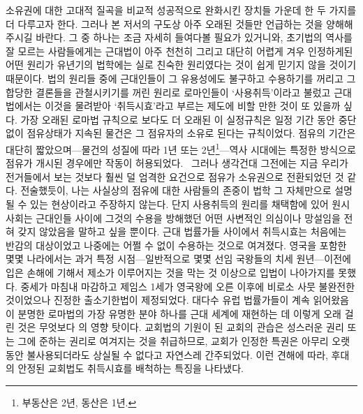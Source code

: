 소유권에 대한 고대적 질곡을 비교적 성공적으로 완화시킨 장치들 가운데
한 두 가지를 더 다루고자 한다.
그러나 본 저서의 구도상 아주 오래된 것들만 언급하는 것을
양해해 주시길 바란다.
그 중 하나는 조금 자세히 들여다볼 필요가 있거니와,
초기법의 역사를 잘 모르는 사람들에게는
근대법이 아주 천천히 그리고 대단히 어렵게 겨우 인정하게된
어떤 원리가 유년기의 법학에는 실로 친숙한 원리였다는 것이
쉽게 믿기지 않을 것이기 때문이다.
법의 원리들 중에
근대인들이 그 유용성에도 불구하고
수용하기를 꺼리고 그 합당한 결론들을 관철시키기를 꺼린
원리로
로마인들이 `\hypertarget{usucapio}{사용취득}'이라고
불렀고
근대법에서는
이것을 물려받아
`취득시효'라고 부르는 제도에
비할 만한 것이 또 있을까 싶다.
가장 오래된 로마법 규칙으로
보다도 더 오래된
이 실정규칙은
일정 기간 동안 중단 없이 점유상태가 지속된 물건은
그 점유자의 소유로 된다는 규칙이었다.
점유의 기간은 대단히 짧았으며---물건의 성질에 따라
1년 또는 2년\footnote{%
  부동산은 2년, 동산은 1년.
}---역사
시대에는 특정한 방식으로 점유가 개시된 경우에만 작동이 허용되었다.%
\footnotemark\
그러나 생각건대 그전에는
지금 우리가 전거들에서 보는 것보다 훨씬 덜 엄격한 요건으로
점유가 소유권으로 전환되었던 것 같다.%
전술했듯이,
나는 사실상의 점유에 대한 사람들의 존중이
법학 그 자체만으로 설명될 수 있는 현상이라고 주장하지 않는다.
단지 사용취득의 원리를 채택함에 있어 원시사회는
근대인들 사이에 그것의 수용을 방해했던
어떤 사변적인 의심이나 망설임을 전혀 갖지 않았음을 말하고 싶을 뿐이다.
근대 법률가들 사이에서 취득시효는
처음에는 반감의 대상이었고
나중에는 어쩔 수 없이 수용하는 것으로 여겨졌다.
영국을 포함한 몇몇 나라에서는
과거 특정 시점---일반적으로 몇몇 선임 국왕들의 치세 원년---이전에 입은
손해에 기해서 제소가
이루어지는 것을 막는 것 이상으로
입법이 나아가지를 못했다.
중세가 마침내 마감하고
제임스 1세가 영국왕에 오른 이후에
비로소
사뭇 불완전한 것이었으나 진정한
출소기한법이
제정되었다.
대다수 유럽 법률가들이 계속 읽어왔음이 분명한
로마법의 가장 유명한 분야 하나를 근대 세계에 재현하는 데
이렇게 오래 걸린 것은
무엇보다 의 영향 탓이다.
교회법의 기원이 된 교회의 관습은
성스러운 권리 또는 그에 준하는 권리로 여겨지는 것을 취급하므로,
교회가 인정한 특권은
아무리 오랫동안 불사용되더라도
상실될 수 없다고
자연스레
간주되었다.
이런 견해에 따라,
후대의 안정된 교회법도 취득시효를 배척하는 특징을 나타냈다.
